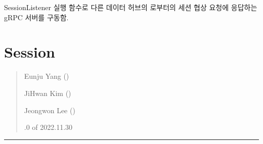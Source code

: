 \documentclass[a4paper,10pt,english]{sphinxmanual}
\begin{document}
\begin{fulllineitems}

\begin{fulllineitems}
\label{\detokenize{_SessionListener:SessionListener.run}}
\pysigstartsignatures
{}
\pysigstopsignatures
\sphinxAtStartPar
SessionListener 실행 함수로 다른 데이터 허브의 {\hyperref[\detokenize{_SessionRequester:sessionrequester}]{}} 로부터의 세션 협상 요청에 응답하는 gRPC 서버를 구동함.

\end{fulllineitems}


\end{fulllineitems}


\sphinxstepscope


\section{Session}
\label{\detokenize{_Session:session}}\label{\detokenize{_Session:id1}}\label{\detokenize{_Session::doc}}\begin{quote}\begin{description}
\begin{DUlineblock}{0em}
\item[] Eunju Yang ()
\item[] JiHwan Kim ()
\item[] Jeongwon Lee ()
\end{DUlineblock}

.0 of 2022.11.30

\end{description}\end{quote}


\bigskip\hrule\bigskip

\end{document}
